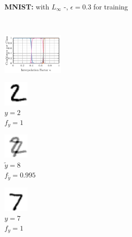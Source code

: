 \begin{figure}[t]
    \centering
    \footnotesize
    \begin{subfigure}{1\textwidth}
        \centering
        \textbf{MNIST:} \textbf{\AdvTrain} with $L_\infty$ \PGD-\FConf, $\epsilon = 0.3$ for training
    \end{subfigure}
    \\[4px]
    \begin{subfigure}{0.225\textwidth}
        \includegraphics[height=2cm]{fig_mnist_advtrain_0_interpolation}
    \end{subfigure}
    \begin{subfigure}{0.085\textwidth}
        \centering
        \includegraphics[height=1.25cm]{fig_mnist_advtrain_0_interpolation_0}\\
        \tiny $y{=}2$\\
        $f_y{=}1$
    \end{subfigure}
    \begin{subfigure}{0.085\textwidth}
        \centering
        \includegraphics[height=1.25cm]{fig_mnist_advtrain_0_interpolation_05}\\
        \tiny $\tilde{y}{=}8$\\
        $f_{\tilde{y}}{=}0.995$
    \end{subfigure}
    \begin{subfigure}{0.085\textwidth}
        \centering
        \includegraphics[height=1.25cm]{fig_mnist_advtrain_0_interpolation_1}\\
        \tiny $y{=}7$\\
        $f_y{=}1$
    \end{subfigure}
    \begin{subfigure}{0.225\textwidth}

\end{subfigure}
\end{figure}
